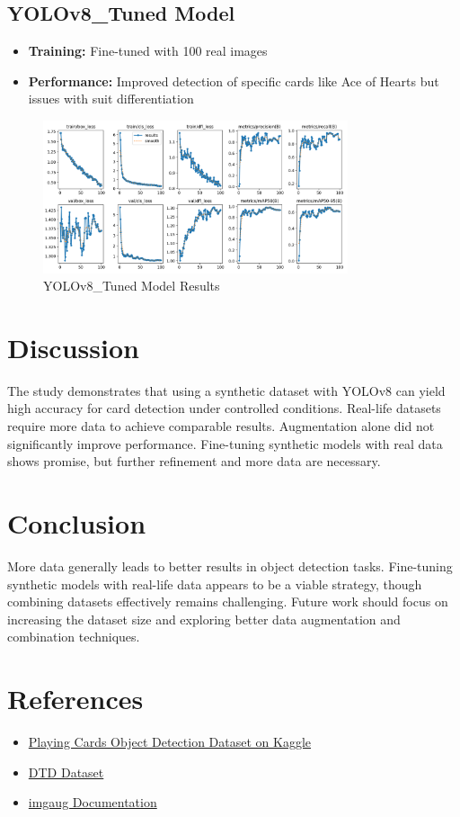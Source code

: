 \documentclass{article}
\begin{document}
\newpage
\subsection{YOLOv8\_Tuned Model}
\begin{itemize}
  \item \textbf{Training:} Fine-tuned with 100 real images
  \item \textbf{Performance:} Improved detection of specific cards like Ace of Hearts but issues with suit differentiation
\end{itemize}
\begin{figure}[htbp]
  \centering
  \includegraphics[width=0.8\textwidth]{./media/yolov8_tuned_results.png}
  \caption{YOLOv8\_Tuned Model Results}
  \label{fig:tuned_results}
\end{figure}


\section{Discussion}
The study demonstrates that using a synthetic dataset with YOLOv8 can yield high accuracy for card detection under controlled conditions. Real-life datasets require more data to achieve comparable results. Augmentation alone did not significantly improve performance. Fine-tuning synthetic models with real data shows promise, but further refinement and more data are necessary.

\section{Conclusion}
More data generally leads to better results in object detection tasks. Fine-tuning synthetic models with real-life data appears to be a viable strategy, though combining datasets effectively remains challenging. Future work should focus on increasing the dataset size and exploring better data augmentation and combination techniques.

\section{References}
\begin{itemize}
  \item \href{https://www.kaggle.com/datasets/andy8744/playing-cards-object-detection-dataset}{Playing Cards Object Detection Dataset on Kaggle}
  \item \href{https://www.robots.ox.ac.uk/~vgg/data/dtd/}{DTD Dataset}
  \item \href{https://imgaug.readthedocs.io/en/latest/}{imgaug Documentation}
\end{itemize}
\end{document}
